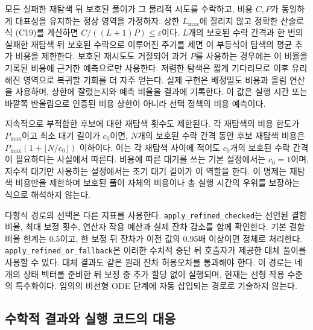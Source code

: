 \documentclass[
  10pt,
  dvipsnames]{article}
\begin{document}
모든 실패한 재탐색 뒤 보호된 풀이가 그 물리적 시도를 수락하고, 비용
\(C,P\)가 동일하게 대표성을 유지하는 정상 영역을 가정하자. 상한
\(L_{\max}\)에 잘리지 않고 정확한 산술로 식 (C19)를 계산하면
\(C/((L+1)P)\le\varepsilon\)이다. \(L\)개의 보호된 수락 간격과 한 번의
실패한 재탐색 뒤 보호된 수락으로 이루어진 주기를 세면 이 부등식이 탐색의
평균 추가 비용을 제한한다. 보호된 재시도도 거절되어 과거 \(P\)를
사용하는 경우에는 이 비율을 기록된 비용에 근거한 예측으로만 사용한다.
저렴한 탐색은 짧게 기다리므로 이후 유리해진 영역으로 복귀할 기회를 더
자주 얻는다. 실제 구현은 배정밀도 비용과 올림 연산을 사용하며, 상한에
잘렸는지와 예측 비율을 결과에 기록한다. 이 값은 실행 시간 또는 바깥쪽
반올림으로 인증된 비용 상한이 아니라 선택 정책의 비용 예측이다.

지속적으로 부적합한 후보에 대한 재탐색 횟수도 제한된다. 각 재탐색의 비용
한도가 \(P_{\max}\)이고 최소 대기 길이가 \(c_0\)이면, \(N\)개의 보호된
수락 간격 동안 후보 재탐색 비용은 \(P_{\max}(1+\lfloor N/c_0\rfloor)\)
이하이다. 이는 각 재탐색 사이에 적어도 \(c_0\)개의 보호된 수락 간격이
필요하다는 사실에서 따른다. 비용에 따른 대기를 쓰는 기본 설정에서는
\(c_0=1\)이며, 지수적 대기만 사용하는 설정에서는 초기 대기 길이가 이
역할을 한다. 이 명제는 재탐색 비용만을 제한하며 보호된 풀이 자체의
비용이나 총 실행 시간의 우위를 보장하는 식으로 해석하지 않는다.

다항식 경로의 선택은 다른 지표를 사용한다.
\texttt{apply\_refined\_checked}는 선언된 결함 비율, 최대 보정 횟수,
연산자 작용 예산과 실제 잔차 감소를 함께 확인한다. 기본 결함 비율 한계는
0.5이고, 한 보정 뒤 잔차가 이전 값의 0.95배 이상이면 정체로 처리한다.
\texttt{apply\_refined\_or\_fallback}은 이러한 수치적 중단 뒤 호출자가
제공한 대체 풀이를 사용할 수 있다. 대체 결과도 같은 원래 잔차 허용오차를
통과해야 한다. 이 경로는 네 개의 상태 벡터를 준비한 뒤 보정 중 추가 할당
없이 실행되며, 현재는 선형 작용 수준의 특수화이다. 임의의 비선형 ODE
단계에 자동 삽입되는 경로로 기술하지 않는다.

\hypertarget{uxc218uxd559uxc801-uxacb0uxacfcuxc640-uxc2e4uxd589-uxcf54uxb4dcuxc758-uxb300uxc751}{%
\subsection{수학적 결과와 실행 코드의
대응}\label{uxc218uxd559uxc801-uxacb0uxacfcuxc640-uxc2e4uxd589-uxcf54uxb4dcuxc758-uxb300uxc751}}
\end{document}
